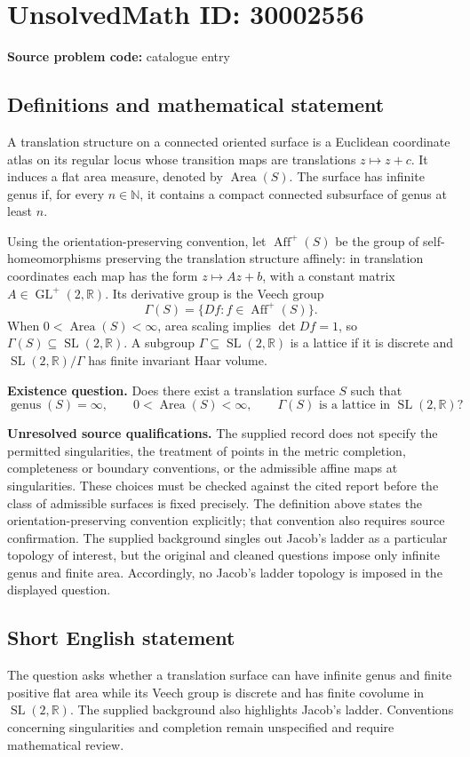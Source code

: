 \documentclass[11pt]{article}
\newcommand{\N}{\mathbb{N}}
\newcommand{\R}{\mathbb{R}}
\begin{document}
\section*{UnsolvedMath ID: 30002556}
\textbf{Source problem code:} catalogue entry
\subsection{Definitions and mathematical statement}
A translation structure on a connected oriented surface is a Euclidean coordinate atlas on its regular locus whose transition maps are translations \(z\mapsto z+c\). It induces a flat area measure, denoted by \(\operatorname{Area}(S)\). The surface has infinite genus if, for every \(n\in\N\), it contains a compact connected subsurface of genus at least \(n\).

Using the orientation-preserving convention, let \(\operatorname{Aff}^{+}(S)\) be the group of self-homeomorphisms preserving the translation structure affinely: in translation coordinates each map has the form \(z\mapsto Az+b\), with a constant matrix \(A\in\operatorname{GL}^{+}(2,\R)\). Its derivative group is the Veech group
\[
\Gamma(S)=\{Df:f\in\operatorname{Aff}^{+}(S)\}.
\]
When \(0<\operatorname{Area}(S)<\infty\), area scaling implies \(\det Df=1\), so \(\Gamma(S)\subseteq\operatorname{SL}(2,\R)\). A subgroup \(\Gamma\subseteq\operatorname{SL}(2,\R)\) is a lattice if it is discrete and \(\operatorname{SL}(2,\R)/\Gamma\) has finite invariant Haar volume.

\textbf{Existence question.} Does there exist a translation surface \(S\) such that
\[
\operatorname{genus}(S)=\infty,\qquad
0<\operatorname{Area}(S)<\infty,\qquad
\Gamma(S)\text{ is a lattice in }\operatorname{SL}(2,\R)?
\]

\textbf{Unresolved source qualifications.} The supplied record does not specify the permitted singularities, the treatment of points in the metric completion, completeness or boundary conventions, or the admissible affine maps at singularities. These choices must be checked against the cited report before the class of admissible surfaces is fixed precisely. The definition above states the orientation-preserving convention explicitly; that convention also requires source confirmation. The supplied background singles out Jacob's ladder as a particular topology of interest, but the original and cleaned questions impose only infinite genus and finite area. Accordingly, no Jacob's ladder topology is imposed in the displayed question.
\subsection{Short English statement}
The question asks whether a translation surface can have infinite genus and finite positive flat area while its Veech group is discrete and has finite covolume in \(\operatorname{SL}(2,\R)\). The supplied background also highlights Jacob's ladder. Conventions concerning singularities and completion remain unspecified and require mathematical review.
\end{document}
